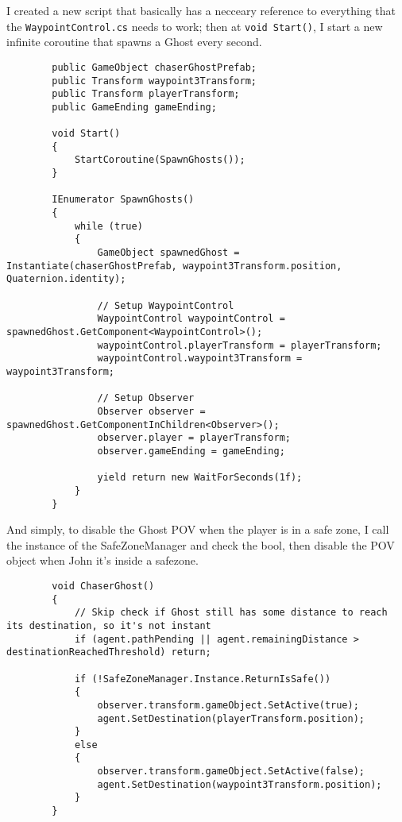     I created a new script that basically has a necceary reference to everything that the \texttt{WaypointControl.cs} needs to work; then at \texttt{void Start()}, I start a new infinite coroutine that spawns a Ghost every second.
    \begin{verbatim}
        public GameObject chaserGhostPrefab;
        public Transform waypoint3Transform;
        public Transform playerTransform;
        public GameEnding gameEnding;

        void Start()
        {
            StartCoroutine(SpawnGhosts());
        }

        IEnumerator SpawnGhosts()
        {
            while (true)
            {
                GameObject spawnedGhost = Instantiate(chaserGhostPrefab, waypoint3Transform.position, Quaternion.identity);

                // Setup WaypointControl
                WaypointControl waypointControl = spawnedGhost.GetComponent<WaypointControl>();
                waypointControl.playerTransform = playerTransform;
                waypointControl.waypoint3Transform = waypoint3Transform;

                // Setup Observer
                Observer observer = spawnedGhost.GetComponentInChildren<Observer>();
                observer.player = playerTransform;
                observer.gameEnding = gameEnding;

                yield return new WaitForSeconds(1f);
            }
        }
    \end{verbatim}

    And simply, to disable the Ghost POV when the player is in a safe zone, I call the instance of the SafeZoneManager and check the bool, then disable the POV object when John it's inside a safezone.
    \begin{verbatim}
        void ChaserGhost()
        {
            // Skip check if Ghost still has some distance to reach its destination, so it's not instant
            if (agent.pathPending || agent.remainingDistance > destinationReachedThreshold) return;

            if (!SafeZoneManager.Instance.ReturnIsSafe())
            {
                observer.transform.gameObject.SetActive(true);
                agent.SetDestination(playerTransform.position);
            }
            else
            {
                observer.transform.gameObject.SetActive(false);
                agent.SetDestination(waypoint3Transform.position);
            }
        }
    \end{verbatim}
